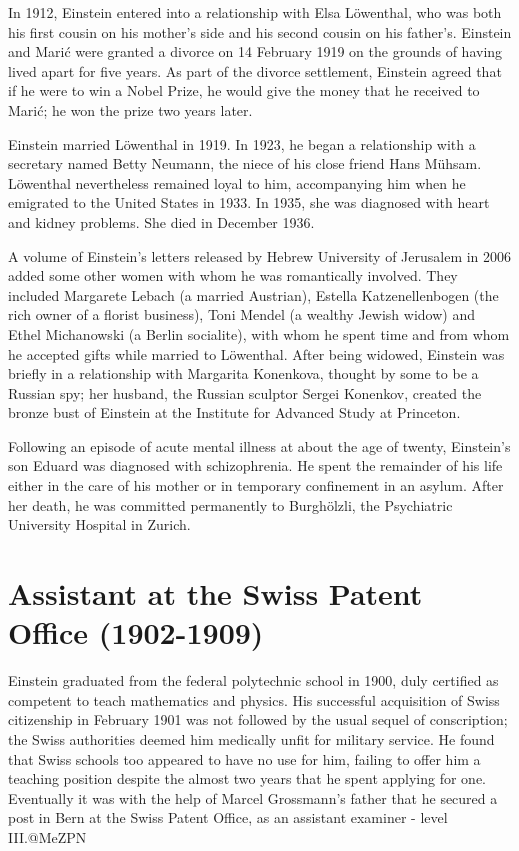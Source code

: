 \documentclass[twoside]{memoir}
\begin{document}
In 1912, Einstein entered into a relationship with Elsa Löwenthal, who was both his first cousin on his mother's side and his second cousin on his father's. Einstein and Marić were granted a divorce on 14 February 1919 on the grounds of having lived apart for five years. As part of the divorce settlement, Einstein agreed that if he were to win a Nobel Prize, he would give the money that he received to Marić; he won the prize two years later.

Einstein married Löwenthal in 1919. In 1923, he began a relationship with a secretary named Betty Neumann, the niece of his close friend Hans Mühsam. Löwenthal nevertheless remained loyal to him, accompanying him when he emigrated to the United States in 1933. In 1935, she was diagnosed with heart and kidney problems. She died in December 1936.

A volume of Einstein's letters released by Hebrew University of Jerusalem in 2006 added some other women with whom he was romantically involved. They included Margarete Lebach (a married Austrian), Estella Katzenellenbogen (the rich owner of a florist business), Toni Mendel (a wealthy Jewish widow) and Ethel Michanowski (a Berlin socialite), with whom he spent time and from whom he accepted gifts while married to Löwenthal. After being widowed, Einstein was briefly in a relationship with Margarita Konenkova, thought by some to be a Russian spy; her husband, the Russian sculptor Sergei Konenkov, created the bronze bust of Einstein at the Institute for Advanced Study at Princeton.

Following an episode of acute mental illness at about the age of twenty, Einstein's son Eduard was diagnosed with schizophrenia. He spent the remainder of his life either in the care of his mother or in temporary confinement in an asylum. After her death, he was committed permanently to Burghölzli, the Psychiatric University Hospital in Zurich.
\chapter{Assistant at the Swiss Patent Office (1902-1909)}
Einstein graduated from the federal polytechnic school in 1900, duly certified as competent to teach mathematics and physics. His successful acquisition of Swiss citizenship in February 1901 was not followed by the usual sequel of conscription; the Swiss authorities deemed him medically unfit for military service. He found that Swiss schools too appeared to have no use for him, failing to offer him a teaching position despite the almost two years that he spent applying for one. Eventually it was with the help of Marcel Grossmann's father that he secured a post in Bern at the Swiss Patent Office,\cite{ODY5p} as an assistant examiner - level III.@MeZPN
\end{document}
